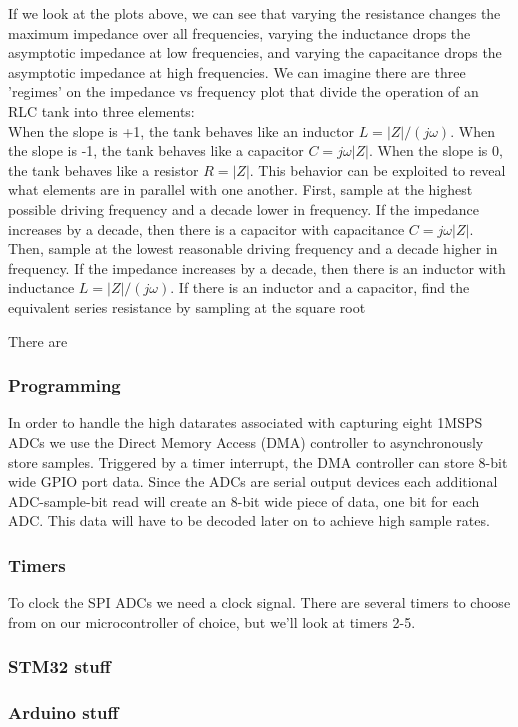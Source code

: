 \documentclass[11pt, a4paper]{article}
\begin{document}
If we look at the plots above, we can see that varying the resistance changes the maximum impedance over all frequencies, varying the inductance drops the asymptotic impedance at low frequencies, and varying the capacitance drops the asymptotic impedance at high frequencies.
We can imagine there are three 'regimes' on the impedance vs frequency plot that divide the operation of an RLC tank into three elements:\\
When the slope is +1, the tank behaves like an inductor 
$L=|Z|/(j\omega)$.
When the slope is -1, the tank behaves like a capacitor
$C=j\omega |Z|$.
When the slope is 0, the tank behaves like a resistor
$R=|Z|$.
This behavior can be exploited to reveal what elements are in parallel with one another.
First, sample at the highest possible driving frequency and a decade lower in frequency.
If the impedance increases by a decade, then there is a capacitor with capacitance $C=j\omega |Z|$.
Then, sample at the lowest reasonable driving frequency and a decade higher in frequency.
If the impedance increases by a decade, then there is an inductor with inductance $L=|Z|/(j\omega)$.
If there is an inductor and a capacitor, find the equivalent series resistance by sampling at the square root 

There are 

\subsubsection{Programming}

In order to handle the high datarates associated with capturing eight 1MSPS ADCs we use the Direct Memory Access (DMA) controller to asynchronously store samples.
Triggered by a timer interrupt, the DMA controller can store 8-bit wide GPIO port data.
Since the ADCs are serial output devices each additional ADC-sample-bit read will create an 8-bit wide piece of data, one bit for each ADC.
This data will have to be decoded later on to achieve high sample rates.

\subsubsection{Timers}

To clock the SPI ADCs we need a clock signal.   
There are several timers to choose from on our microcontroller of choice, but we'll look at timers 2-5.

\subsubsection{STM32 stuff}

\subsubsection{Arduino stuff}

\begin{thebibliography}{1}
\end{thebibliography}
\end{document}
